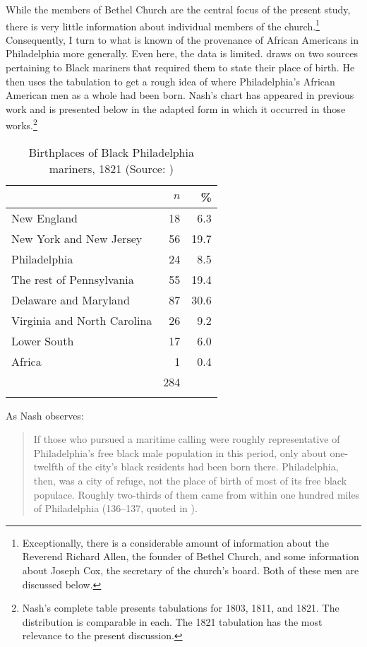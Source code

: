 \documentclass[output=paper,colorlinks,citecolor=brown]{langscibook}
\begin{document}
While the members of Bethel Church are the central focus of the present study, there is very little information about individual members of the church.\footnote{Exceptionally, there is a considerable amount of information about the Reverend Richard Allen, the founder of Bethel Church, and some information about Joseph Cox, the secretary of the church’s board. Both of these men are discussed below.} Consequently, I turn to what is known of the provenance of African Americans in Philadelphia more generally. Even here, the data is limited. \citet{Nash1988} draws on two sources pertaining to Black mariners that required them to state their place of birth. He then uses the tabulation to get a rough idea of where Philadelphia’s African American men as a whole had been born. Nash’s chart has appeared in previous work \parencites[]{Singler1998}[13]{PoplackTagliamonte2001}[315]{Singler2007part2} and is presented below in the adapted form in which it occurred in those works.\footnote{Nash’s complete table presents tabulations for 1803, 1811, and 1821. The distribution is comparable in each. The 1821 tabulation has the most relevance to the present discussion.}

\begin{table}
\caption{Birthplaces of Black Philadelphia mariners, 1821 (Source: \citealt[136]{Nash1988})\label{tab:2 singler:2}}

\begin{tabular}{lrr}
\lsptoprule
& $n$ & \%\\
\midrule
New England & 18 & 6.3\\
New York and New Jersey & 56 & 19.7\\
Philadelphia & 24 & 8.5\\
The rest of Pennsylvania & 55 & 19.4\\
Delaware and Maryland & 87 & 30.6\\
Virginia and North Carolina & 26 & 9.2\\
Lower South & 17 & 6.0\\
Africa & 1 & 0.4\\
\midrule
& 284 & \\
\lspbottomrule
\end{tabular}
\end{table}

As Nash observes:

\begin{quote}
If those who pursued a maritime calling were roughly representative of Philadelphia’s free black male population in this period, only about one-twelfth of the city’s black residents had been born there. Philadelphia, then, was a city of refuge, not the place of birth of most of its free black populace. Roughly two-thirds of them came from within one hundred miles of Philadelphia (136–137, quoted in \cites[]{Singler1998}[314]{Singler2007part2}).
\end{quote}
\end{document}
